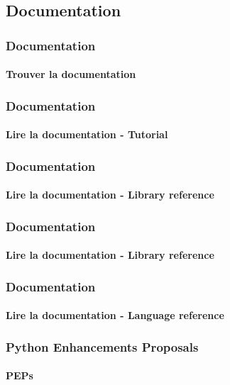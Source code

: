 \subsection{Documentation}
\begin{frame}
\frametitle{Documentation}
\framesubtitle{Trouver la documentation}
\end{frame}
\begin{frame}
\frametitle{Documentation}
\framesubtitle{Lire la documentation - Tutorial}
\end{frame}
\begin{frame}
\frametitle{Documentation}
\framesubtitle{Lire la documentation - Library reference}
\end{frame}
\begin{frame}
\frametitle{Documentation}
\framesubtitle{Lire la documentation - Library reference}
\end{frame}
\begin{frame}
\frametitle{Documentation}
\framesubtitle{Lire la documentation - Language reference}
\end{frame}
\begin{frame}
\frametitle{Python Enhancements Proposals}
\framesubtitle{PEPs}
{%
}
\end{frame}
